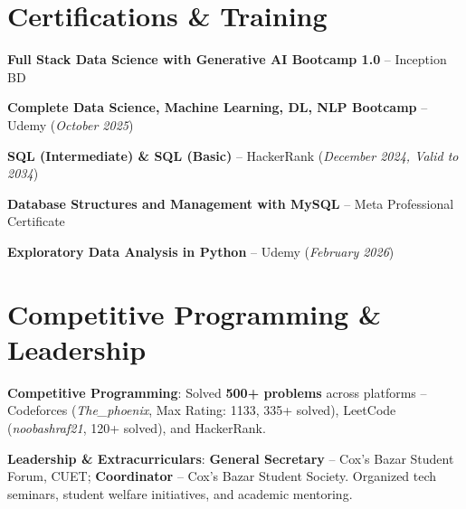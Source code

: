 \documentclass[a4paper,10pt]{article}
\begin{document}
\section{Certifications \& Training}
\begin{itemize}[leftmargin=12pt, topsep=1pt, itemsep=1.5pt]
  \small{
    \item \textbf{Full Stack Data Science with Generative AI Bootcamp 1.0} -- Inception BD
    \item \textbf{Complete Data Science, Machine Learning, DL, NLP Bootcamp} -- Udemy (\textit{October 2025})
    \item \textbf{SQL (Intermediate) \& SQL (Basic)} -- HackerRank (\textit{December 2024, Valid to 2034})
    \item \textbf{Database Structures and Management with MySQL} -- Meta Professional Certificate
    \item \textbf{Exploratory Data Analysis in Python} -- Udemy (\textit{February 2026})
  }
\end{itemize}

\section{Competitive Programming \& Leadership}
\begin{itemize}[leftmargin=12pt, topsep=1pt, itemsep=1.5pt]
  \small{
    \item \textbf{Competitive Programming}: Solved \textbf{500+ problems} across platforms -- Codeforces (\textit{The\_phoenix}, Max Rating: 1133, 335+ solved), LeetCode (\textit{noobashraf21}, 120+ solved), and HackerRank.
    \item \textbf{Leadership \& Extracurriculars}: \textbf{General Secretary} -- Cox's Bazar Student Forum, CUET; \textbf{Coordinator} -- Cox's Bazar Student Society. Organized tech seminars, student welfare initiatives, and academic mentoring.
  }
\end{itemize}
\end{document}

